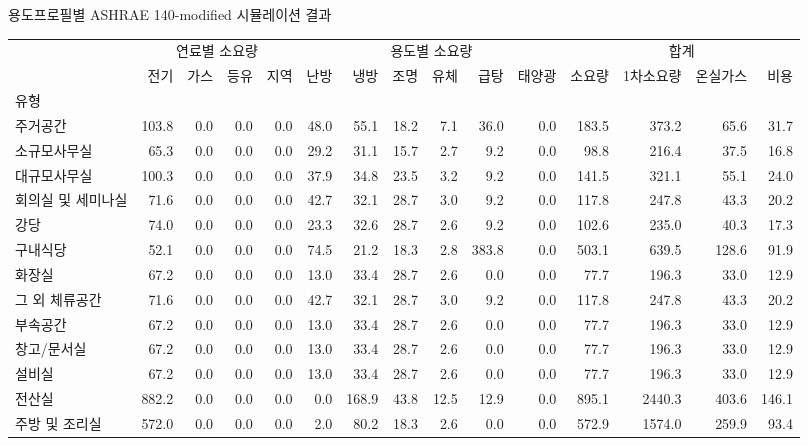 \begin{defaulttable}
\tiny
\caption{용도프로필별 ASHRAE 140-modified 시뮬레이션 결과}

\begin{tabular}{lrrrrrrrrrrrrrr}
\toprule
 & \multicolumn{4}{|c}{연료별 소요량} & \multicolumn{6}{|c}{용도별 소요량} & \multicolumn{4}{|c}{합계} \\
 & 전기 & 가스 & 등유 & 지역 & 난방 & 냉방 & 조명 & 유체 & 급탕 & 태양광 & 소요량 & 1차소요량 & 온실가스 & 비용 \\
유형 &  &  &  &  &  &  &  &  &  &  &  &  &  &  \\
\midrule
주거공간 & 103.8 & 0.0 & 0.0 & 0.0 & 48.0 & 55.1 & 18.2 & 7.1 & 36.0 & 0.0 & 183.5 & 373.2 & 65.6 & 31.7 \\
소규모사무실 & 65.3 & 0.0 & 0.0 & 0.0 & 29.2 & 31.1 & 15.7 & 2.7 & 9.2 & 0.0 & 98.8 & 216.4 & 37.5 & 16.8 \\
대규모사무실 & 100.3 & 0.0 & 0.0 & 0.0 & 37.9 & 34.8 & 23.5 & 3.2 & 9.2 & 0.0 & 141.5 & 321.1 & 55.1 & 24.0 \\
회의실 및 세미나실 & 71.6 & 0.0 & 0.0 & 0.0 & 42.7 & 32.1 & 28.7 & 3.0 & 9.2 & 0.0 & 117.8 & 247.8 & 43.3 & 20.2 \\
강당 & 74.0 & 0.0 & 0.0 & 0.0 & 23.3 & 32.6 & 28.7 & 2.6 & 9.2 & 0.0 & 102.6 & 235.0 & 40.3 & 17.3 \\
구내식당 & 52.1 & 0.0 & 0.0 & 0.0 & 74.5 & 21.2 & 18.3 & 2.8 & 383.8 & 0.0 & 503.1 & 639.5 & 128.6 & 91.9 \\
화장실 & 67.2 & 0.0 & 0.0 & 0.0 & 13.0 & 33.4 & 28.7 & 2.6 & 0.0 & 0.0 & 77.7 & 196.3 & 33.0 & 12.9 \\
그 외 체류공간 & 71.6 & 0.0 & 0.0 & 0.0 & 42.7 & 32.1 & 28.7 & 3.0 & 9.2 & 0.0 & 117.8 & 247.8 & 43.3 & 20.2 \\
부속공간 & 67.2 & 0.0 & 0.0 & 0.0 & 13.0 & 33.4 & 28.7 & 2.6 & 0.0 & 0.0 & 77.7 & 196.3 & 33.0 & 12.9 \\
창고/문서실 & 67.2 & 0.0 & 0.0 & 0.0 & 13.0 & 33.4 & 28.7 & 2.6 & 0.0 & 0.0 & 77.7 & 196.3 & 33.0 & 12.9 \\
설비실 & 67.2 & 0.0 & 0.0 & 0.0 & 13.0 & 33.4 & 28.7 & 2.6 & 0.0 & 0.0 & 77.7 & 196.3 & 33.0 & 12.9 \\
전산실 & 882.2 & 0.0 & 0.0 & 0.0 & 0.0 & 168.9 & 43.8 & 12.5 & 12.9 & 0.0 & 895.1 & 2440.3 & 403.6 & 146.1 \\
주방 및 조리실 & 572.0 & 0.0 & 0.0 & 0.0 & 2.0 & 80.2 & 18.3 & 2.6 & 0.0 & 0.0 & 572.9 & 1574.0 & 259.9 & 93.4 \\

\end{tabular}
\end{defaulttable}
